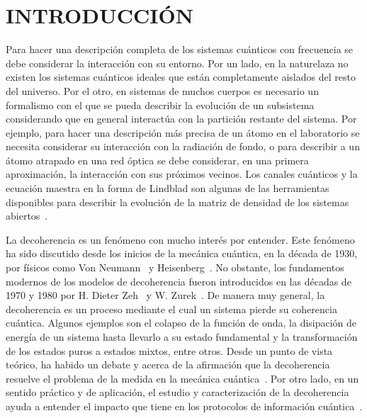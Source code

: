 \chapter{INTRODUCCIÓN}
Para hacer una descripción completa de los sistemas cuánticos 
con frecuencia se debe considerar la interacción con su entorno. Por un lado, 
en la naturelaza no existen los sistemas cuánticos ideales que 
están completamente aislados del resto del universo. 
Por el otro, en sistemas de muchos cuerpos es necesario un formalismo
con el que se pueda describir la evolución de un subsistema considerando
que en general interactúa con la partición restante del sistema.
Por ejemplo, para hacer una descripción más precisa de un átomo en el laboratorio se
necesita considerar su interacción con la radiación de fondo, 
o para describir a un átomo atrapado en una red óptica se debe considerar, 
en una primera aproximación, la interacción con sus próximos vecinos.
Los canales cuánticos y la ecuación maestra en la forma de Lindblad son algunas
de las herramientas disponibles para describir la evolución de la 
matriz de densidad de los sistemas abiertos~\cite{nielsen_chuang_2011}. 

La decoherencia es un fenómeno con mucho interés por entender. 
Este fenómeno ha sido discutido desde los inicios de la mecánica cuántica,
en la década de 1930, por físicos como
Von Neumann~\cite{von2018mathematical} y Heisenberg~\cite{bacciagaluppi2003role}.
No obstante, los fundamentos modernos de los modelos
de decoherencia fueron introducidos en las décadas de 1970 y 1980 
por H. Dieter Zeh~\cite{zeh1970interpretation}  y W. Zurek~\cite{zurek1981pointer}. 
De manera muy general, la decoherencia es un proceso mediante el cual 
un sistema pierde su coherencia cuántica. 
Algunos ejemplos son el colapso de 
la función de onda, la disipación de energía 
de un sistema hasta llevarlo a su estado fundamental y la transformación de los 
estados puros a estados mixtos, entre otros.
Desde un punto de vista teórico, ha habido un debate y acerca de la afirmación
que la decoherencia resuelve el problema de la medida en 
la mecánica cuántica~\cite{bacciagaluppi2003role}.
Por otro lado, en un sentido práctico y de aplicación, 
el estudio y caracterización de la decoherencia 
ayuda a entender el impacto que tiene en los protocolos de información 
cuántica~\cite{pepino2011open}. 

